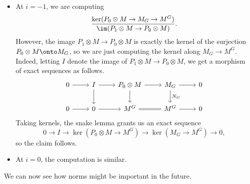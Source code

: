 \documentclass[../notes.tex]{subfiles}
\begin{document}
\begin{itemize}
	\item At $i=-1$, we are computing
	\[\frac{\ker(P_0\otimes M\to M_G\to M^G)}{\im(P_1\otimes M\to P_0\otimes M)}.\]
	However, the image $P_1\otimes M\to P_0\otimes M$ is exactly the kernel of the surjection $P_0\otimes M\onto M_G$, so we are just computing the kernel along $M_G\to M^G$. Indeed, letting $I$ denote the image of $P_1\otimes M\to P_0\otimes M$, we get a morphism of exact sequences as follows.
	\[\begin{tikzcd}
		0 & I & {P_0\otimes M} & {M_G} & 0 \\
		0 & 0 & {M^G} & {M^G} & 0
		\arrow["{N_G}", from=1-4, to=2-4]
		\arrow[from=1-1, to=1-2]
		\arrow[from=1-2, to=1-3]
		\arrow[from=1-3, to=1-4]
		\arrow[from=1-4, to=1-5]
		\arrow[from=2-4, to=2-5]
		\arrow[Rightarrow, no head, from=2-3, to=2-4]
		\arrow[from=1-3, to=2-3]
		\arrow[from=2-1, to=2-2]
		\arrow[from=2-2, to=2-3]
		\arrow[from=1-2, to=2-2]
	\end{tikzcd}\]
	Taking kernels, the snake lemma grants us an exact sequence
	\[0\to I\to\ker(P_0\otimes M\to M^G)\to\ker(M_G\to M^G)\to0,\]
	so the claim follows.
	\item At $i=0$, the computation is similar.
\end{itemize}
\begin{remark}
	We can now see how norms might be important in the future.
\end{remark}
\end{document}
